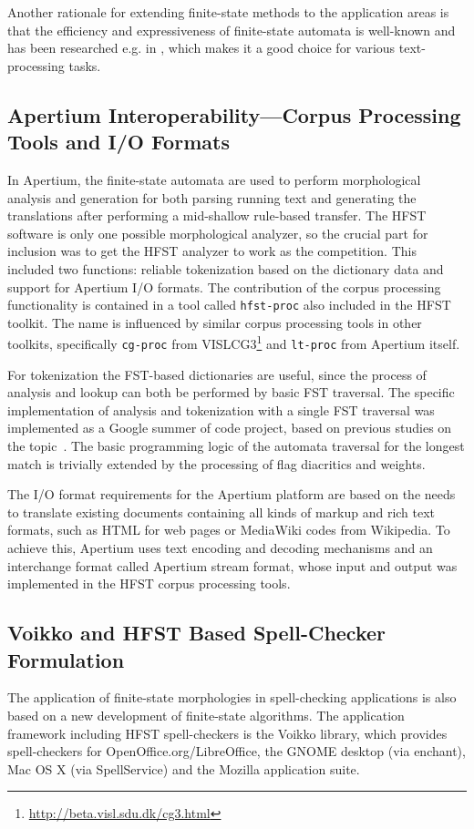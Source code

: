 \documentclass{llncs}
\begin{document}
Another rationale for extending finite-state methods to the application areas
is that the efficiency and expressiveness of finite-state automata is
well-known and has been researched e.g. in \cite{aho/2007}, which makes it a good choice
for various text-processing tasks.

\subsection{Apertium Interoperability---Corpus Processing Tools and I/O Formats}
In Apertium, the finite-state automata are used to perform morphological analysis and generation for
both parsing running text and generating the translations after performing
a mid-shallow rule-based transfer. The HFST software is only one possible morphological analyzer, 
so the crucial part for inclusion was to get the HFST analyzer to work as the competition. 
This included two functions: reliable tokenization based on
the dictionary data and support for Apertium I/O formats. The 
contribution of the corpus processing functionality is contained in a tool
called \texttt{hfst-proc} also included in the HFST toolkit. The name is influenced by
similar corpus processing tools in other toolkits, specifically
\texttt{cg-proc} from VISLCG3\footnote{\url{http://beta.visl.sdu.dk/cg3.html}} and
\texttt{lt-proc} from Apertium itself.

For tokenization the FST-based dictionaries are useful, since the process of
analysis and lookup can both be performed by basic FST traversal. The specific
implementation of analysis and tokenization with a single FST traversal was
implemented as a Google summer of code project, based on previous studies on
the topic~\cite{garrido-alenda/2002}. The basic programming logic of the automata traversal
for the longest match is trivially extended by the processing of flag diacritics
and weights.

The I/O format requirements for the Apertium platform are based on the needs to
translate existing documents containing all kinds of markup and rich text
formats, such as HTML for web pages or MediaWiki codes from Wikipedia. To
achieve this, Apertium uses text encoding and decoding mechanisms and
an interchange format called Apertium stream format, whose input and output
was implemented in the HFST corpus processing tools.

\subsection{Voikko and HFST Based Spell-Checker Formulation}\label{spellcheck}
The application of finite-state morphologies in spell-checking applications
is also based on a new development of finite-state algorithms. The application
framework including HFST spell-checkers is the Voikko library, which provides
spell-checkers for OpenOffice.org/LibreOffice, the GNOME desktop (via
enchant), Mac OS X (via SpellService) and the Mozilla application suite.
\end{document}
